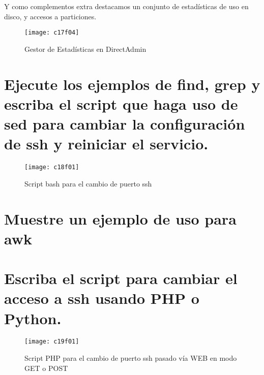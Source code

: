 Y como complementos extra destacamos un conjunto de estadísticas de uso en disco, y accesos a particiones.
\begin{figure}[H]
	\centering
	\texttt{[image: c17f04]}
	\caption{Gestor de Estadísticas en DirectAdmin}
	\label{fig:c17f04}
\end{figure}

\section{Ejecute los ejemplos de find, grep y escriba el script que haga uso de sed para cambiar la configuración de ssh y reiniciar el servicio.}

\begin{figure}[H]
	\centering
	\texttt{[image: c18f01]}
	\caption{Script bash para el cambio de puerto ssh}
	\label{fig:c18f01}
\end{figure}



\section{Muestre un ejemplo de uso para awk}







\section{Escriba el script para cambiar el acceso a ssh usando PHP o Python.}


\begin{figure}[H]
	\centering
	\texttt{[image: c19f01]}
	\caption{Script PHP para el cambio de puerto ssh pasado vía WEB en modo GET o POST}
	\label{fig:c19f01}
\end{figure}




